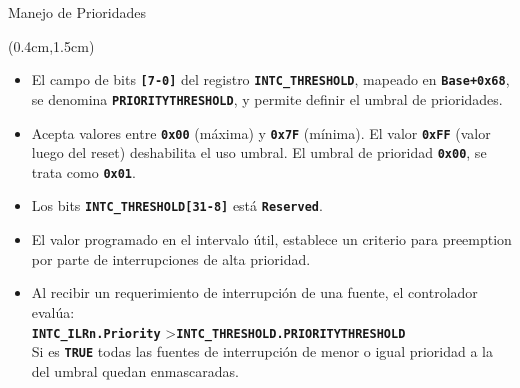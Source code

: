 \documentclass[usenames,table,xcolor={x11names},aspectratio=169]{beamer}
\begin{document}
\begin{frame}[t]{Manejo de Prioridades}
 \begin{textblock*}{\textwidth}(0.4cm,1.5cm)
  \begin{itemize}[<+(1)->]\justifying \parskip 0.18cm
   \item El campo de bits \texttt{\textbf{[7-0]}} del registro \texttt{\textbf{INTC\_THRESHOLD}}, mapeado en \texttt{\textbf{Base+0x68}}, se denomina \textbf{\texttt{PRIORITYTHRESHOLD}}, y permite definir el umbral de prioridades. 
   \item Acepta valores entre \texttt{\textbf{0x00}} (máxima) y \textbf{\texttt{0x7F}} (mínima). El valor \texttt{\textbf{0xFF}} (valor luego del reset) deshabilita el uso umbral. El umbral de prioridad \texttt{\textbf{0x00}}, se trata como \texttt{\textbf{0x01}}.
   \item Los bits \texttt{\textbf{INTC\_THRESHOLD[31-8]}} está \texttt{\textbf{Reserved}}.
   \item El valor programado en el intervalo útil, establece un criterio para preemption por parte de interrupciones de alta prioridad. 
   \item Al recibir un requerimiento de interrupción de una fuente, el controlador evalúa:\\
   \small{\texttt{\textbf{INTC\_ILRn.Priority}} \textgreater \texttt{\textbf{INTC\_THRESHOLD.PRIORITYTHRESHOLD}}}\\
   Si es \textbf{\texttt{TRUE}} todas las fuentes de interrupción de menor o igual prioridad a la del umbral quedan enmascaradas. 
  \end{itemize}
 \end{textblock*}
\end{frame}
\end{document}
